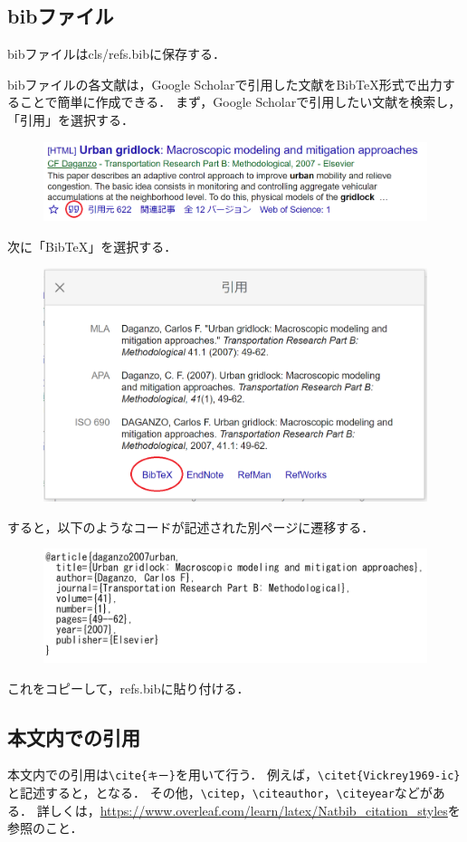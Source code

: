 \documentclass[../main/main]{subfiles}
\begin{document}
\subsection{bibファイル}
bibファイルはcls/refs.bibに保存する．
\par
bibファイルの各文献は，Google Scholarで引用した文献をBibTeX形式で出力することで簡単に作成できる．
まず，Google Scholarで引用したい文献を検索し，「引用」を選択する．
\begin{figure}[!ht]
  \centering
  \includegraphics[clip, width=0.5\columnwidth]{image/bib1.png}
  \label{fig:bib1}
\end{figure}
\par
次に「BibTeX」を選択する．
\begin{figure}[!ht]
  \centering
  \includegraphics[clip, width=0.5\columnwidth]{image/bib2.png}
  \label{fig:bib1}
\end{figure}
\par
すると，以下のようなコードが記述された別ページに遷移する．
\begin{figure}[!ht]
  \centering
  \includegraphics[clip, width=0.5\columnwidth]{image/bib3.png}
  \label{fig:bib1}
\end{figure}
\par
これをコピーして，refs.bibに貼り付ける．

\subsection{本文内での引用}
本文内での引用は\verb|\cite{キー}|を用いて行う．
例えば，\verb|\citet{Vickrey1969-ic}|と記述すると，\citet{Vickrey1969-ic}となる．
その他，\verb|\citep|，\verb|\citeauthor|，\verb|\citeyear|などがある．
詳しくは，\url{https://www.overleaf.com/learn/latex/Natbib\_citation\_styles}を参照のこと．
\end{document}
